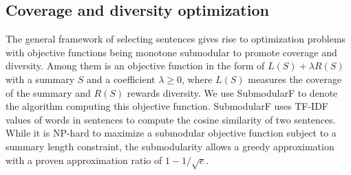 \documentclass[a4paper,twoside]{article}
\begin{document}
\subsection{Coverage and diversity optimization}

The general framework of selecting sentences gives rise to optimization problems with objective functions
being monotone submodular \cite{lin:11} to promote coverage and diversity.
Among them is an objective function in the form of $L(S) + \lambda R(S)$ with
%
a summary $S$ and a coefficient $\lambda \geq 0$, where
$L(S)$ measures the coverage of the summary and $R(S)$ rewards diversity.
We use SubmodularF to denote the algorithm computing this objective function.
SubmodularF uses TF-IDF values of words in sentences to compute the cosine similarity of two sentences.
While
it is NP-hard to maximize a submodular objective function subject to a summary length constraint, the submodularity allows
a greedy approximation with a proven approximation ratio of $1-1/\sqrt{e}$.
%
%
\end{document}
